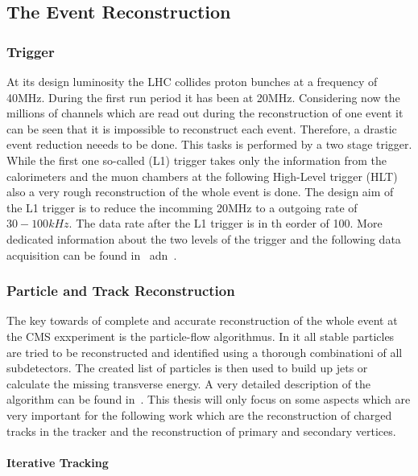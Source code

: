 \subsection{The Event Reconstruction \label{LHCCMSEventReco}}

\subsubsection{Trigger}

At its design luminosity the LHC collides proton bunches at a frequency of 40\unit{MHz}. During the first run period it has been at 20\unit{MHz}. Considering now the millions of channels which are read out during the reconstruction of one event it can be seen that it is impossible to reconstruct each event. Therefore, a drastic event reduction neeeds to be done. This tasks is performed by a two stage trigger. While the first one so-called \Lone{} (L1) trigger takes only the information from the calorimeters and the muon chambers at the following High-Level trigger (HLT) also a very rough reconstruction of the whole event is done. The design aim of the L1 trigger is to reduce the incomming 20\unit{MHz} to a outgoing rate of $30-100\unit{kHz}$. The data rate after the L1 trigger is in th eorder of 100\GBytes{}. More dedicated information about the two levels of the trigger and the following data acquisition can be found in~ adn~.

\subsubsection{Particle and Track Reconstruction}

The key towards of complete and accurate reconstruction of the whole event at the CMS exxperiment is the particle-flow algorithmus. In it all stable particles are tried to be reconstructed and identified using a thorough combinationi of all subdetectors. The created list of particles is then used to build up jets or calculate the missing transverse energy. A very detailed description of the algorithm can be found in~. This thesis will only focus on some aspects which are very important for the following work which are the reconstruction of charged tracks in the tracker and the reconstruction of primary and secondary vertices.

\paragraph{Iterative Tracking}

